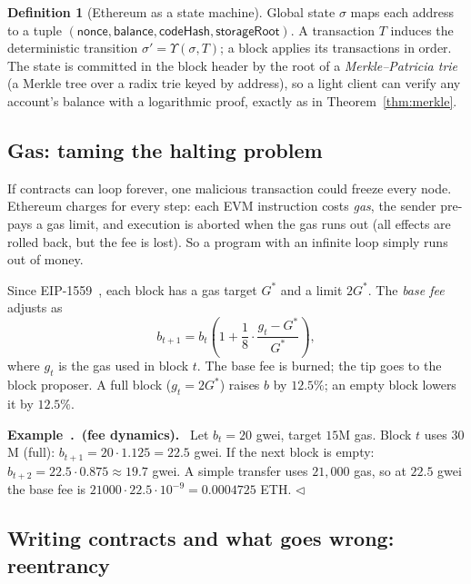 \documentclass[11pt,a4paper]{article}
\newcounter{exn}[section]
\renewcommand{\theexn}{\thesection.\arabic{exn}}
\newenvironment{plainenglish}{\par\smallskip}{\par\smallskip}
\newenvironment{formal}{\par\smallskip}{\par\smallskip}
\newenvironment{exbox}[1][]{\par\medskip\refstepcounter{exn}\noindent\textbf{Example~\theexn\if\relax\detokenize{#1}\relax\else\ (#1)\fi.}\ \ignorespaces}{\hfill$\triangleleft$\par\medskip}
\theoremstyle{definition}
\newtheorem{definition}{Definition}[section]
\theoremstyle{plain}
\theoremstyle{remark}
\begin{document}
\begin{formal}
\begin{definition}[Ethereum as a state machine]
Global state $\sigma$ maps each address to a tuple $(\mathsf{nonce},\allowbreak\mathsf{balance},\allowbreak\mathsf{codeHash},\allowbreak\mathsf{storageRoot})$. A transaction $T$ induces the deterministic transition $\sigma'=\Upsilon(\sigma,T)$; a block applies its transactions in order. The state is committed in the block header
by the root of a \emph{Merkle--Patricia trie} (a Merkle tree over a radix trie keyed by address), so a light client can verify any account's balance with a logarithmic proof, exactly as in Theorem~\ref{thm:merkle}.
\end{definition}
\end{formal}

\subsection{Gas: taming the halting problem}

\begin{plainenglish}
If contracts can loop forever, one malicious transaction could freeze every node. Ethereum charges for every step: each EVM instruction costs \emph{gas}, the sender pre-pays a gas limit, and execution is aborted when the gas runs out (all effects are
rolled back, but the fee is lost). So a program with an infinite loop simply runs out of money.
\end{plainenglish}

\begin{formal}
Since EIP-1559~\cite{EIP1559}, each block has a gas target $G^*$ and a limit $2G^*$. The \emph{base fee} adjusts as
$$b_{t+1}=b_t\left(1+\frac{1}{8}\cdot\frac{g_t-G^*}{G^*}\right),$$
where $g_t$ is the gas used in block $t$. The base fee is burned; the tip goes to the block proposer. A full block ($g_t=2G^*$) raises $b$ by $12.5\%$; an empty block lowers it by $12.5\%$.
\end{formal}

\begin{exbox}[fee dynamics]
Let $b_t=20$ gwei, target $15$M gas. Block $t$ uses $30$M (full): $b_{t+1}=20\cdot1.125=22.5$ gwei. If the next block is empty: $b_{t+2}=22.5\cdot0.875\approx19.7$ gwei. A simple transfer uses $21{,}000$ gas, so at $22.5$ gwei the base fee is $21000\cdot22.5\cdot10^{-9}=0.0004725$ ETH.
\end{exbox}

\subsection{Writing contracts and what goes wrong: reentrancy}
\end{document}
